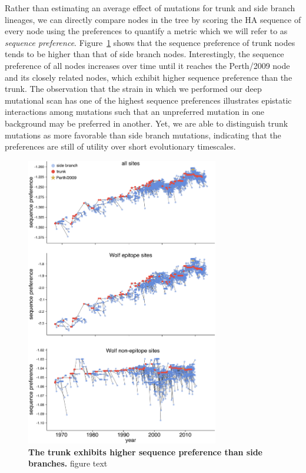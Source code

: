 \documentclass[11pt]{article}
\begin{document}
Rather than estimating an average effect of mutations for trunk and side branch lineages, we can directly compare nodes in the tree by scoring the HA sequence of every node using the preferences to quantify a metric which we will refer to as \textit{sequence preference}.
Figure~\ref{fig:sequence_preference} shows that the sequence preference of trunk nodes tends to be higher than that of side branch nodes.
Interestingly, the sequence preference of all nodes increases over time until it reaches the Perth/2009 node and its closely related nodes, which exhibit higher sequence preference than the trunk. 
The observation that the strain in which we performed our deep mutational scan has one of the highest sequence preferences illustrates epistatic interactions among mutations such that an unpreferred mutation in one background may be preferred in another.
Yet, we are able to distinguish trunk mutations as more favorable than side branch mutations, indicating that the preferences are still of utility over short evolutionary timescales. 

\begin{figure}
\centerline{\includegraphics[width=0.75\textwidth]{figs/sequence_preference/sequence_preference.pdf}}
\caption{\label{fig:sequence_preference}
{\bf The trunk exhibits higher sequence preference than side branches.}
figure text
}
\end{figure}
\end{document}
